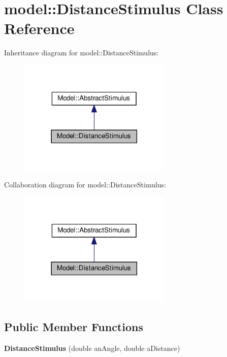\hypertarget{class_model_1_1_distance_stimulus}{}\section{model\+:\+:Distance\+Stimulus Class Reference}
\label{class_model_1_1_distance_stimulus}


Inheritance diagram for model\+:\+:Distance\+Stimulus\+:
\nopagebreak
\begin{figure}[H]
\begin{center}
\leavevmode
\includegraphics[width=206pt]{class_model_1_1_distance_stimulus__inherit__graph}
\end{center}
\end{figure}


Collaboration diagram for model\+:\+:Distance\+Stimulus\+:
\nopagebreak
\begin{figure}[H]
\begin{center}
\leavevmode
\includegraphics[width=206pt]{class_model_1_1_distance_stimulus__coll__graph}
\end{center}
\end{figure}
\subsection*{Public Member Functions}
\begin{DoxyCompactItemize}
\item 
{\bfseries Distance\+Stimulus} (double an\+Angle, double a\+Distance)\hypertarget{class_model_1_1_distance_stimulus_a5ec267e4e945106911cd9fff534e2b07}{}\label{class_model_1_1_distance_stimulus_a5ec267e4e945106911cd9fff534e2b07}

\end{DoxyCompactItemize}
